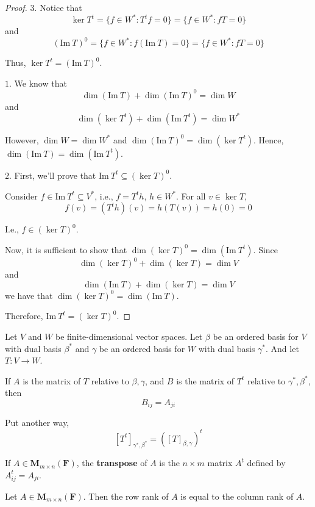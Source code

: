 \begin{proof}
	$3.$ Notice that 
	\[
		\ker T^t = \{ f \in W^\ast : T^t f = 0 \} = \{ f \in W^\ast : fT = 0 \}
	\]
	and
	\[
		(\text{Im}~T)^0 = \{ f \in W^\ast : f(\text{Im}~T) = 0 \} = \{ f \in W^\ast : fT = 0 \}
	\]
	
	Thus, $\ker T^t = (\text{Im}~T)^0$.
	
	$1.$ We know that
	\[
		\dim (\text{Im}~T) + \dim (\text{Im}~T)^0 = \dim W
	\]
	and
	\[
		\dim (\ker T^t) + \dim (\text{Im}~T^t) = \dim W^\ast
	\]
	
	However, $\dim W = \dim W^\ast$ and $\dim (\text{Im}~T)^0 = \dim (\ker T^t)$. Hence, $\dim (\text{Im}~T) = \dim(\text{Im}~T^t)$.
	
	$2.$ First, we'll prove that $\text{Im}~T^t \subseteq (\ker T)^0$.
	
	Consider $f \in \text{Im}~T^t \subseteq V^\ast$, i.e., $f = T^t h$, $h \in W^\ast$. For all $v \in \ker T$,
	\[
		f(v) = (T^t h)(v) = h(T(v)) = h(0) = 0
	\]
	
	I.e., $f \in (\ker T)^0$.
	
	Now, it is sufficient to show that $\dim (\ker T)^0 = \dim (\text{Im}~T^t)$. Since
	\[
		\dim (\ker T)^0 + \dim (\ker T) = \dim V
	\]
	and
	\[
		\dim (\text{Im}~T) + \dim (\ker T) = \dim V
	\]
	we have that $\dim (\ker T)^0 = \dim (\text{Im}~T)$.
	
	Therefore, $\text{Im}~T^t = (\ker T)^0$.
\end{proof}

\begin{theorem}
	Let $V$ and $W$ be finite-dimensional vector spaces. Let $\beta$ be an ordered basis for $V$ with dual basis $\beta^\ast$ and $\gamma$ be an ordered basis for $W$ with dual basis $\gamma^\ast$. And let $T : V \longrightarrow W$.

	If $A$ is the matrix of $T$ relative to $\beta, \gamma$, and $B$ is the matrix of $T^t$ relative to $\gamma^\ast, \beta^\ast$, then 
	\[ 
		B_{ij} = A_{ji}
	\]

	Put another way,
	\[
		[T^t]_{\gamma^\ast, \beta^\ast} = ([T]_{\beta, \gamma})^t
	\]
\end{theorem}

\begin{definition}[Transpose]
	If $A \in \textbf{M}_{m \times n}(\textbf{F})$, the \textbf{transpose} of $A$ is the $n \times m$ matrix $A^t$ defined by $A_{ij}^t = A_{ji}$.
\end{definition}

\begin{theorem}
	Let $A \in \textbf{M}_{m \times n}(\textbf{F})$. Then the row rank of $A$ is equal to the column rank of $A$.
\end{theorem}